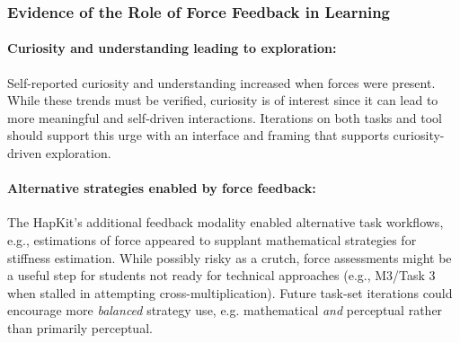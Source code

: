 \subsubsection{Evidence of the Role of Force Feedback in Learning}

\paragraph{Curiosity and understanding leading to exploration:}
Self-reported curiosity and understanding increased when forces were present. 
%
%
While these trends must be verified, curiosity is of interest since it can lead to more meaningful and self-driven interactions.
%
Iterations on both tasks and tool should support this urge with an interface and framing that supports curiosity-driven exploration.

\paragraph{Alternative strategies enabled by force feedback:}
%
The HapKit's additional feedback modality enabled alternative task workflows, e.g., %
 estimations of force appeared to supplant mathematical strategies for stiffness estimation.
While possibly risky as a crutch, force assessments might be a useful step for students not ready for technical approaches (e.g., M3/Task 3 when  stalled in attempting cross-multiplication).
Future task-set iterations could encourage more \textit{balanced} strategy use, e.g. mathematical \textit{and} perceptual rather than primarily perceptual.


